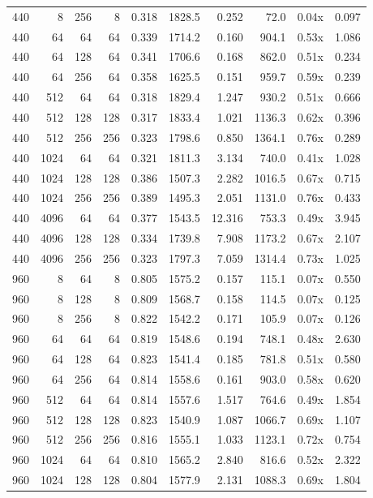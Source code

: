 {\begin{longtable}{rrrrrrrrrr}
440 & 8 & 256 & 8 & 0.318 & 1828.5 & 0.252 & 72.0 & 0.04x & 0.097\\
440 & 64 & 64 & 64 & 0.339 & 1714.2 & 0.160 & 904.1 & 0.53x & 1.086\\
440 & 64 & 128 & 64 & 0.341 & 1706.6 & 0.168 & 862.0 & 0.51x & 0.234\\
440 & 64 & 256 & 64 & 0.358 & 1625.5 & 0.151 & 959.7 & 0.59x & 0.239\\
440 & 512 & 64 & 64 & 0.318 & 1829.4 & 1.247 & 930.2 & 0.51x & 0.666\\
440 & 512 & 128 & 128 & 0.317 & 1833.4 & 1.021 & 1136.3 & 0.62x & 0.396\\
440 & 512 & 256 & 256 & 0.323 & 1798.6 & 0.850 & 1364.1 & 0.76x & 0.289\\
440 & 1024 & 64 & 64 & 0.321 & 1811.3 & 3.134 & 740.0 & 0.41x & 1.028\\
440 & 1024 & 128 & 128 & 0.386 & 1507.3 & 2.282 & 1016.5 & 0.67x & 0.715\\
440 & 1024 & 256 & 256 & 0.389 & 1495.3 & 2.051 & 1131.0 & 0.76x & 0.433\\
440 & 4096 & 64 & 64 & 0.377 & 1543.5 & 12.316 & 753.3 & 0.49x & 3.945\\
440 & 4096 & 128 & 128 & 0.334 & 1739.8 & 7.908 & 1173.2 & 0.67x & 2.107\\
440 & 4096 & 256 & 256 & 0.323 & 1797.3 & 7.059 & 1314.4 & 0.73x & 1.025\\
960 & 8 & 64 & 8 & 0.805 & 1575.2 & 0.157 & 115.1 & 0.07x & 0.550\\
960 & 8 & 128 & 8 & 0.809 & 1568.7 & 0.158 & 114.5 & 0.07x & 0.125\\
960 & 8 & 256 & 8 & 0.822 & 1542.2 & 0.171 & 105.9 & 0.07x & 0.126\\
960 & 64 & 64 & 64 & 0.819 & 1548.6 & 0.194 & 748.1 & 0.48x & 2.630\\
960 & 64 & 128 & 64 & 0.823 & 1541.4 & 0.185 & 781.8 & 0.51x & 0.580\\
960 & 64 & 256 & 64 & 0.814 & 1558.6 & 0.161 & 903.0 & 0.58x & 0.620\\
960 & 512 & 64 & 64 & 0.814 & 1557.6 & 1.517 & 764.6 & 0.49x & 1.854\\
960 & 512 & 128 & 128 & 0.823 & 1540.9 & 1.087 & 1066.7 & 0.69x & 1.107\\
960 & 512 & 256 & 256 & 0.816 & 1555.1 & 1.033 & 1123.1 & 0.72x & 0.754\\
960 & 1024 & 64 & 64 & 0.810 & 1565.2 & 2.840 & 816.6 & 0.52x & 2.322\\
960 & 1024 & 128 & 128 & 0.804 & 1577.9 & 2.131 & 1088.3 & 0.69x & 1.804\\

\end{longtable}}
